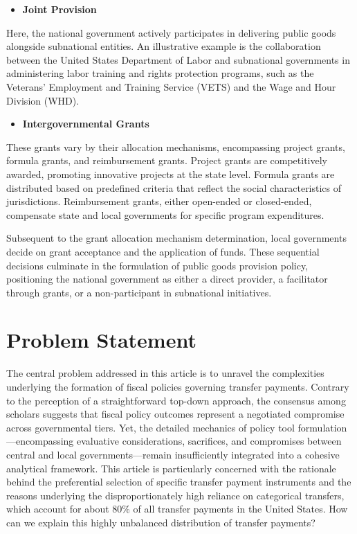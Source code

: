 \begin{itemize}
    \item \textbf{Joint Provision}
\end{itemize}

Here, the national government actively participates in delivering public goods alongside subnational entities. An illustrative example is the collaboration between the United States Department of Labor and subnational governments in administering labor training and rights protection programs, such as the Veterans' Employment and Training Service (VETS) and the Wage and Hour Division (WHD).

\begin{itemize}
    \item \textbf{Intergovernmental Grants}
\end{itemize}


These grants vary by their allocation mechanisms, encompassing project grants, formula grants, and reimbursement grants. Project grants are competitively awarded, promoting innovative projects at the state level. Formula grants are distributed based on predefined criteria that reflect the social characteristics of jurisdictions\parencite{huffman2006formula}. Reimbursement grants, either open-ended or closed-ended, compensate state and local governments for specific program expenditures.


Subsequent to the grant allocation mechanism determination, local governments decide on grant acceptance and the application of funds. These sequential decisions culminate in the formulation of public goods provision policy, positioning the national government as either a direct provider, a facilitator through grants, or a non-participant in subnational initiatives.


\section{Problem Statement}
The central problem addressed in this article is to unravel the complexities underlying the formation of fiscal policies governing transfer payments. Contrary to the perception of a straightforward top-down approach, the consensus among scholars suggests that fiscal policy outcomes represent a negotiated compromise across governmental tiers\parencite{chubb1985political, 1976A, dixit1995redistributive}. Yet, the detailed mechanics of policy tool formulation—encompassing evaluative considerations, sacrifices, and compromises between central and local governments—remain insufficiently integrated into a cohesive analytical framework. This article is particularly concerned with the rationale behind the preferential selection of specific transfer payment instruments and the reasons underlying the disproportionately high reliance on categorical transfers, which account for about 80\% of all transfer payments in the United States\parencite{dilger2015federal}. How can we explain this highly unbalanced distribution of transfer payments?

